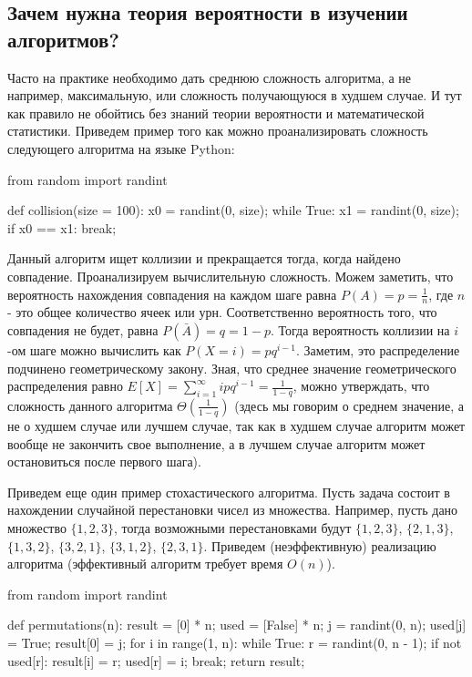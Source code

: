 \subsection{Зачем нужна теория вероятности в изучении алгоритмов?}

Часто на практике необходимо дать среднюю сложность алгоритма,
а не например, максимальную, или сложность получающуюся в худшем случае. 
И тут как правило не обойтись без знаний теории вероятности и 
математической статистики. Приведем пример того как можно 
проанализировать сложность следующего алгоритма на языке Python:

\begin{python}
from random import randint

def collision(size = 100):
	x0 = randint(0, size);
	while True:
		x1 = randint(0, size);
		if x0 == x1:
			break;
\end{python}

Данный алгоритм ищет коллизии и прекращается тогда, когда найдено совпадение. Проанализируем
вычислительную сложность. Можем заметить, что вероятность нахождения совпадения на каждом шаге
равна $P(A) = p = \frac{1}{n}$, где $n$ - это общее количество ячеек или урн. Соответственно вероятность
того, что совпадения не будет, равна $P(\bar{A})=q=1-p$. Тогда вероятность 
коллизии на $i$-ом шаге можно вычислить как $P(X=i)=pq^{i-1}$.
Заметим, это распределение подчинено геометрическому закону.
Зная, что среднее значение геометрического распределения равно 
$E[X] = \sum_{i=1}^{\infty} ipq^{i-1} = \frac{1}{1-q}$, 
можно утверждать, что сложность данного алгоритма 
$\Theta(\frac{1}{1-q})$ (здесь мы говорим о среднем значение, а не о худшем случае или
лучшем случае, так как в худшем случае алгоритм может вообще не закончить свое 
выполнение, а в лучшем случае алгоритм может остановиться после первого шага).

Приведем еще один пример стохастического алгоритма. Пусть задача состоит в нахождении
случайной перестановки чисел из множества. Например, пусть дано множество $\{1, 2, 3\}$, 
тогда возможными перестановками будут  $\{1, 2, 3\}$, $\{2, 1, 3\}$, $\{1, 3, 2\}$,
$\{3, 2, 1\}$, $\{3, 1, 2\}$, $\{2, 3, 1\}$. Приведем (неэффективную) реализацию 
алгоритма (эффективный алгоритм требует время $O(n)$).

\begin{python}
from random import randint

def permutations(n):
	result = [0] * n;
	used = [False] * n;
	j = randint(0, n);
	used[j] = True;
	result[0] = j;
	for i in range(1, n):
		while True:
			r = randint(0, n - 1);
			if not used[r]:
				result[i] = r;
				used[r] = i;
				break;
	return result;
\end{python}


